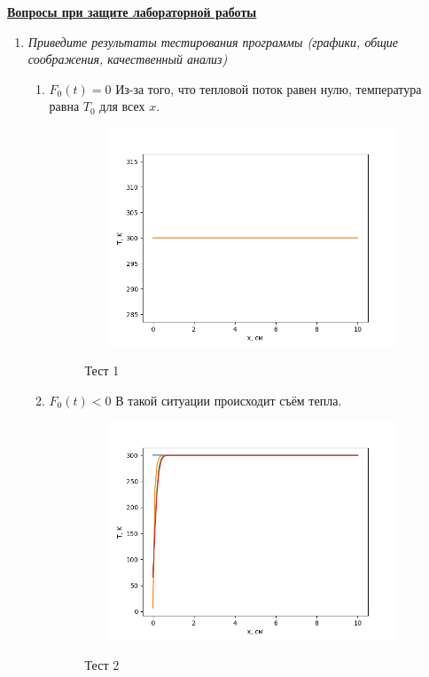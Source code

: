 \underline{\textbf{Вопросы при защите лабораторной работы}}\\
\begin{enumerate}
\item \textit{Приведите результаты тестирования программы (графики, общие соображения, качественный анализ)}

\begin{enumerate}
	\item $F_0(t) = 0$
	Из-за того, что тепловой поток равен нулю, температура равна $T_0$ для всех $x$.
	\begin{figure}[pt!]
	\begin{center}
		{\includegraphics[height=6.5cm, width = 10cm]{../pictures/Figure_3}}
		\caption{Тест 1}
	\end{center}
	\end{figure}

\newpage

	\item $F_0(t) < 0$
	В такой ситуации происходит съём тепла.
	\begin{figure}[h]
		\begin{center}
			{\includegraphics[height=6.5cm, width = 10cm]{../pictures/Figure_4}}
			\caption{Тест 2}
		\end{center}
	\end{figure}

	
\end{enumerate}
\end{enumerate}








